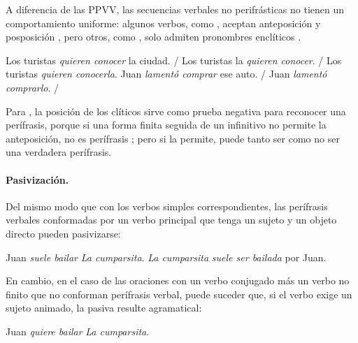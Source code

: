 A diferencia de las PPVV, las secuencias verbales no perifrásticas no tienen un
comportamiento uniforme: algunos verbos, como , aceptan anteposición y posposición ,
pero otros, como , solo admiten
pronombres enclíticos .

\begin{exe}
  \ex\label{ex:11-turistas} Los turistas \textit{quieren conocer} la ciudad. /
      Los turistas la \textit{quieren conocer}. / Los turistas \textit{quieren
      conocerla}.
  \ex\label{ex:11-lamento} Juan \textit{lamentó comprar} ese auto. / Juan
      \textit{lamentó comprarlo}. / 
\end{exe}

Para \textcite{ditullio2014}, la posición de los clíticos sirve como prueba
negativa para reconocer una perífrasis, porque si una forma finita seguida de un
infinitivo no permite la anteposición, no es perífrasis ;
pero si la permite, puede tanto ser  como no ser
 una verdadera perífrasis.

\paragraph{Pasivización.} Del mismo modo que con los verbos simples
correspondientes, las perífrasis verbales conformadas por un verbo principal que
tenga un sujeto y un objeto directo pueden pasivizarse:

\begin{exe}
  \ex
    \begin{xlist}
      \ex Juan \textit{suele bailar} \textit{La cumparsita}.
      \ex \textit{La cumparsita} \textit{suele ser bailada} por Juan.
    \end{xlist}
\end{exe}

En cambio, en el caso de las oraciones con un verbo conjugado más un verbo no
finito que no conforman perífrasis verbal, puede suceder que, si el verbo exige
un sujeto animado, la pasiva resulte agramatical:

\begin{exe}
  \ex
    \begin{xlist}
      \ex Juan \textit{quiere bailar} \textit{La cumparsita}.
    \end{xlist}
\end{exe}

